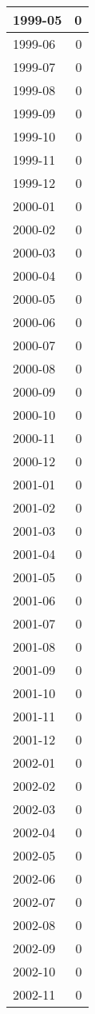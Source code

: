 \documentclass[
]{article}
\begin{document}
\begin{table}[H]
\begin{tabular}{l|r}
\hline
1999-05 & 0\\
\hline
1999-06 & 0\\
\hline
1999-07 & 0\\
\hline
1999-08 & 0\\
\hline
1999-09 & 0\\
\hline
1999-10 & 0\\
\hline
1999-11 & 0\\
\hline
1999-12 & 0\\
\hline
2000-01 & 0\\
\hline
2000-02 & 0\\
\hline
2000-03 & 0\\
\hline
2000-04 & 0\\
\hline
2000-05 & 0\\
\hline
2000-06 & 0\\
\hline
2000-07 & 0\\
\hline
2000-08 & 0\\
\hline
2000-09 & 0\\
\hline
2000-10 & 0\\
\hline
2000-11 & 0\\
\hline
2000-12 & 0\\
\hline
2001-01 & 0\\
\hline
2001-02 & 0\\
\hline
2001-03 & 0\\
\hline
2001-04 & 0\\
\hline
2001-05 & 0\\
\hline
2001-06 & 0\\
\hline
2001-07 & 0\\
\hline
2001-08 & 0\\
\hline
2001-09 & 0\\
\hline
2001-10 & 0\\
\hline
2001-11 & 0\\
\hline
2001-12 & 0\\
\hline
2002-01 & 0\\
\hline
2002-02 & 0\\
\hline
2002-03 & 0\\
\hline
2002-04 & 0\\
\hline
2002-05 & 0\\
\hline
2002-06 & 0\\
\hline
2002-07 & 0\\
\hline
2002-08 & 0\\
\hline
2002-09 & 0\\
\hline
2002-10 & 0\\
\hline
2002-11 & 0\\

\end{tabular}
\end{table}
\end{document}

